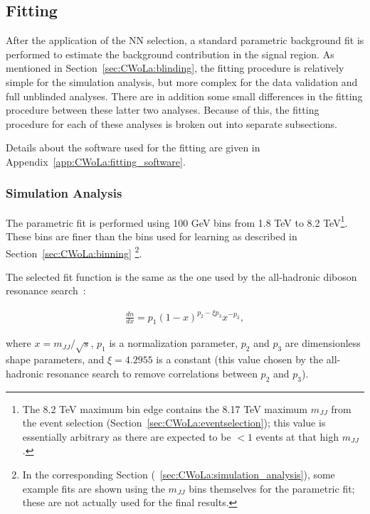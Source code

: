 \subsection{Fitting}
\label{sec:CWoLa:fitting}
After the application of the NN selection, a standard parametric background fit is performed to estimate the background contribution in the signal region.
As mentioned in Section~\ref{sec:CWoLa:blinding}, the fitting procedure is relatively simple for the simulation analysis, but more complex for the data validation and full unblinded analyses.
There are in addition some small differences in the fitting procedure between these latter two analyses.
Because of this, the fitting procedure for each of these analyses is broken out into separate subsections.

Details about the software used for the fitting are given in Appendix~\ref{app:CWoLa:fitting_software}.

\subsubsection{Simulation Analysis}
\label{sec:CWoLa:fitting:simulation_analysis}
The parametric fit is performed using 100 GeV bins
from 1.8 TeV to 8.2 TeV\footnote{The 8.2 TeV maximum bin edge contains the 8.17 TeV maximum $m_{JJ}$ from the event selection (Section~\ref{sec:CWoLa:eventselection}); this value is essentially arbitrary as there are expected to be $<1$ events at that high $m_{JJ}$.}.
These bins are finer than the bins used for learning as described in Section~\ref{sec:CWoLa:binning}
\footnote{In the corresponding Section (~\ref{sec:CWoLa:simulation_analysis}), some example fits are shown using the $m_{JJ}$ bins themselves for the parametric fit; these are not actually used for the final results.}.

The selected fit function is the same as the one used by the all-hadronic diboson resonance search~\cite{Aad:2019fbh}:

\begin{align}
\label{eqn:CWoLa:fitfunction}
\frac{dn}{dx}=p_1(1-x)^{p_2-\xi p_3}x^{-p_3},
\end{align}

\noindent where $x=m_{JJ}/\sqrt{s}$, $p_1$ is a normalization parameter, $p_2$ and $p_3$ are dimensionless shape parameters, and $\xi=4.2955$ is a constant (this value chosen by the all-hadronic resonance search to remove correlations between $p_2$ and $p_3$).

